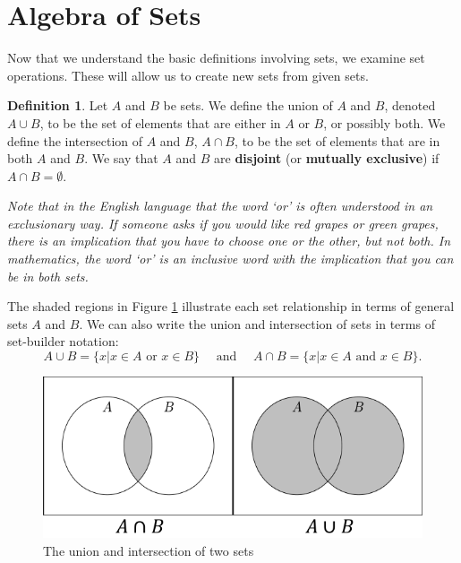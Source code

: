 \documentclass[
]{book}
\let\stdsection\section
\renewcommand\section{\newpage\stdsection}
\theoremstyle{definition}
\newtheorem{definition}{Definition}[chapter]
\theoremstyle{definition}
\theoremstyle{definition}
\theoremstyle{definition}
\theoremstyle{remark}
\begin{document}
\hypertarget{algebra-of-sets}{%
\section{Algebra of Sets}\label{algebra-of-sets}}

Now that we understand the basic definitions involving sets, we examine set operations. These will allow us to create new sets from given sets.

\begin{definition}
Let \(A\) and \(B\) be sets. We define the union of \(A\) and \(B\), denoted \(A \cup B\), to be the set of elements that are either in \(A\) or \(B\), or possibly both. We define the intersection of \(A\) and \(B\), \(A \cap B\), to be the set of elements that are in both \(A\) and \(B\). We say that \(A\) and \(B\) are \textbf{disjoint} (or \textbf{mutually exclusive}) if \(A\cap B = \emptyset\).
\end{definition}

\emph{Note that in the English language that the word `or' is often understood in an exclusionary way. If someone asks if you would like red grapes or green grapes, there is an implication that you have to choose one or the other, but not both. In mathematics, the word `or' is an inclusive word with the implication that you can be in both sets.}

The shaded regions in Figure \ref{fig:set-union} illustrate each set relationship in terms of general sets \(A\) and \(B\). We can also write the union and intersection of sets in terms of set-builder notation:
\[A\cup B = \{x \vert x\in A \mbox{ or } x\in B\} \quad \mbox{ and } \quad A\cap B =\{x\vert x\in A \mbox{ and } x\in B\}.\]

\begin{figure}

{\centering \includegraphics[width=0.7\linewidth]{tikz/Set_unions_intersections} 

}

\caption{The union and intersection of two sets}\label{fig:set-union}
\end{figure}
\end{document}
